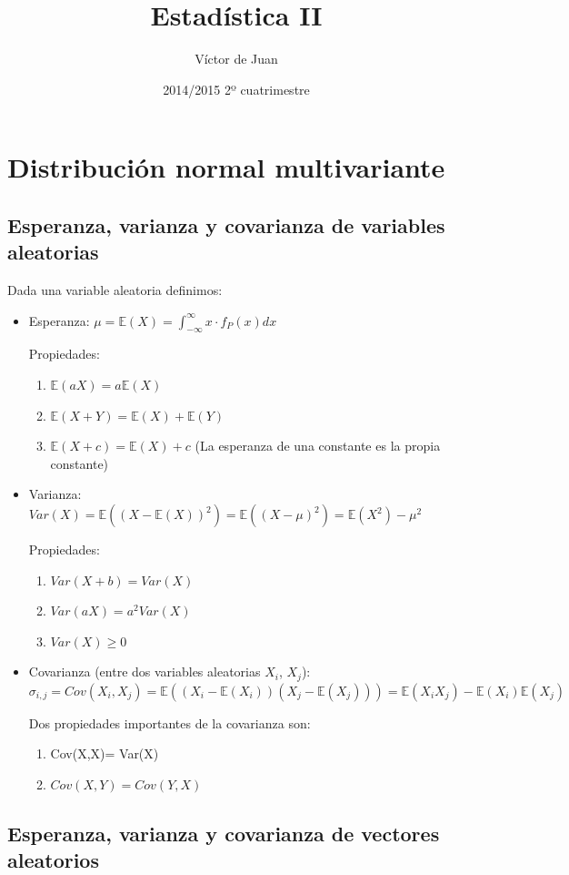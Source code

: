 \documentclass[palatino,nochap]{apuntes}
\author{Víctor de Juan}
\date{2014/2015 2º cuatrimestre}
\title{Estadística II}
\begin{document}
\chapter{Distribución normal multivariante}

\section{Esperanza, varianza y covarianza de variables aleatorias}

Dada una variable aleatoria definimos:
\begin{itemize}
\item Esperanza: $\mu = \mathbb{E}(X) = \int_{-\infty}^{\infty}x\cdot f_P(x) dx$

Propiedades:
\begin{enumerate}
\item $\mathbb{E}(aX) = a\mathbb{E}(X)$
\item $\mathbb{E}(X+Y) = \mathbb{E}(X)+\mathbb{E}(Y)$
\item $\mathbb{E}(X+c) = \mathbb{E}(X)+c$ (La esperanza de una constante es la propia constante)
\end{enumerate}
\item Varianza: $Var(X) = \mathbb{E}((X-\mathbb{E}(X))^2) =\mathbb{E}((X-\mu)^2) = \mathbb{E}(X^2)-\mu^2$

Propiedades:
\begin{enumerate}
\item $Var(X+b)=Var(X)$
\item $Var(aX)=a^2Var(X)$
\item $Var(X)\geq 0$
\end{enumerate}
\item Covarianza (entre dos variables aleatorias $X_i$, $X_j$): $\sigma_{i,j} = Cov(X_i,X_j) = \mathbb{E}\left((X_i-\mathbb{E}(X_i))(X_j-\mathbb{E}(X_j))\right) = \mathbb{E}(X_i X_j)-\mathbb{E}(X_i)\mathbb{E}(X_j)$

Dos propiedades importantes de la covarianza son:

\begin{enumerate}
\item Cov(X,X)= Var(X)
\item $Cov(X,Y)=Cov(Y,X)$
\end{enumerate}

\end{itemize}

\section{Esperanza, varianza y covarianza de vectores aleatorios}
\end{document}
